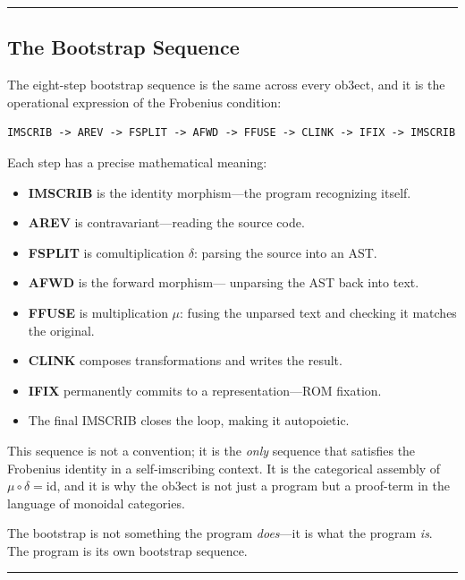 \documentclass[12pt,a4paper]{article}
\begin{document}
\begin{center}
\rule{0.5\textwidth}{0.4pt}
\end{center}

\subsection{The Bootstrap Sequence}

The eight-step bootstrap sequence is the same across every ob3ect, and it is the operational expression of the Frobenius condition:

\begin{lstlisting}
IMSCRIB -> AREV -> FSPLIT -> AFWD -> FFUSE -> CLINK -> IFIX -> IMSCRIB
\end{lstlisting}

Each step has a precise mathematical meaning:

\begin{itemize}
    \item \textbf{IMSCRIB} is the identity morphism---the program recognizing itself.
    \item \textbf{AREV} is contravariant---reading the source code.
    \item \textbf{FSPLIT} is comultiplication $\delta$: parsing the source into an AST.
    \item \textbf{AFWD} is the forward morphism--- unparsing the AST back into text.
    \item \textbf{FFUSE} is multiplication $\mu$: fusing the unparsed text and checking it matches the original.
    \item \textbf{CLINK} composes transformations and writes the result.
    \item \textbf{IFIX} permanently commits to a representation---ROM fixation.
    \item The final IMSCRIB closes the loop, making it autopoietic.
\end{itemize}

This sequence is not a convention; it is the \emph{only} sequence that satisfies the Frobenius identity in a self-imscribing context. It is the categorical assembly of $\mu \circ \delta = \mathrm{id}$, and it is why the ob3ect is not just a program but a proof-term in the language of monoidal categories.

The bootstrap is not something the program \emph{does}---it is what the program \emph{is}. The program is its own bootstrap sequence.

\begin{center}
\rule{0.5\textwidth}{0.4pt}
\end{center}
\end{document}
